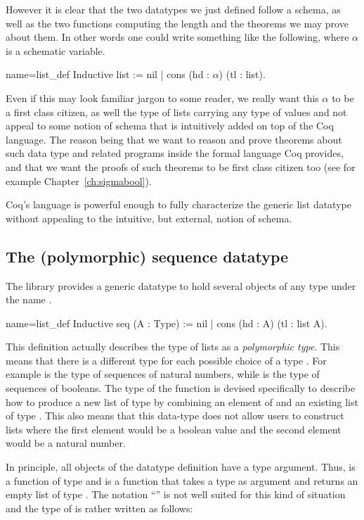 However it is clear that the two datatypes we just defined follow
a schema, as well as the two functions computing the length and the
theorems we may prove about them.  In other words one could write something
like the following, where $\alpha$ is a schematic variable.

\begin{coq}{name=list_def}{}
Inductive list := nil | cons (hd : $\alpha$) (tl : list).
\end{coq}

\noindent Even if this may look familiar jargon to some reader, we really want
this $\alpha$ to be a first class citizen, as well the type of lists carrying
any type of values and not appeal to some notion of schema that is intuitively
added on top of the Coq language.  The reason being that we want to reason and
prove theorems about such data type and related programs inside the formal
language Coq provides, and that we want the proofs of such theorems to be first
class citizen too (see for example Chapter~\ref{ch:sigmabool}).

Coq's language is powerful enough to fully characterize the generic 
list datatype without appealing to the intuitive, but external, notion of
schema.

\subsection{The (polymorphic) sequence datatype}

The \mcbMC{} library provides a generic datatype to hold
several objects of any type under the name .

\begin{coq}{name=list_def}{}
Inductive seq (A : Type) := nil | cons (hd : A) (tl : list A).
\end{coq}
This definition actually describes the type of lists as a {\em
  polymorphic type}.  This means that there is a different type
 for each possible choice of a type .  For example
 is the type of sequences of natural numbers, while
 is the type of sequences of booleans.
The type of the
function  is devised specifically to describe how to produce a
new list of type  by combining an element of  and an
existing list of type .  This also means that this data-type
does not allow users to construct lists where the first element would be
a boolean value and the second element would be a natural number.

In principle, all objects of the datatype definition have a type
argument.  Thus,  is a function of type  and
 is a function that takes a type  as argument and returns
an empty list of type .  The notation ``'' is not
well suited for this kind of situation and the type of  is
rather written as follows:

